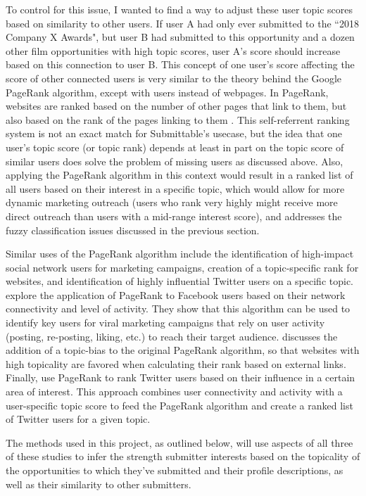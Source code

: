 \documentclass[]{report}   %
\begin{document}
To control for this issue, I wanted to find a way to adjust these user topic scores based on similarity to other users. If user A had only ever submitted to the ``2018 Company X Awards", but user B had submitted to this opportunity and a dozen other film opportunities with high topic scores, user A's score should increase based on this connection to user B. This concept of one user's score affecting the score of other connected users is very similar to the theory behind the Google PageRank algorithm, except with users instead of webpages. In PageRank, websites are ranked based on the number of other pages that link to them, but also based on the rank of the pages linking to them \cite{page_brin_motwani_winograd_1999}. This self-referrent ranking system is not an exact match for Submittable's usecase, but the idea that one user's topic score (or topic rank) depends at least in part on the topic score of similar users does solve the problem of missing users as discussed above. Also, applying the PageRank algorithm in this context would result in a ranked list of all users based on their interest in a specific topic, which would allow for more dynamic marketing outreach (users who rank very highly might receive more direct outreach than users with a mid-range interest score), and addresses the fuzzy classification issues discussed in the previous section.

Similar uses of the PageRank algorithm include the identification of high-impact social network users for marketing campaigns, creation of a topic-specific rank for websites, and identification of highly influential Twitter users on a specific topic.  explore the application of PageRank to Facebook users based on their network connectivity and level of activity. They show that this algorithm can be used to identify key users for viral marketing campaigns that rely on user activity (posting, re-posting, liking, etc.) to reach their target audience.   discusses the addition of a topic-bias to the original PageRank algorithm, so that websites with high topicality are favored when calculating their rank based on external links. Finally,  use PageRank to rank Twitter users based on their influence in a certain area of interest. This approach combines user connectivity and activity with a user-specific topic score to feed the PageRank algorithm and create a ranked list of Twitter users for a given topic.

The methods used in this project, as outlined below, will use aspects of all three of these studies to infer the strength submitter interests based on the topicality of the opportunities to which they've submitted and their profile descriptions, as well as their similarity to other submitters.
\end{document}
